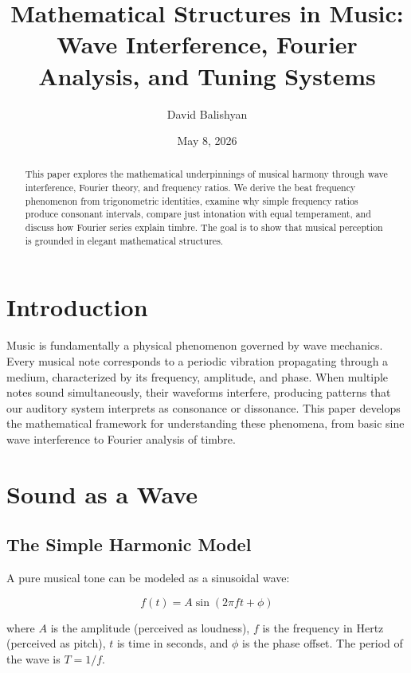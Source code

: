 \documentclass[11pt]{article}
\title{Mathematical Structures in Music: Wave Interference, Fourier Analysis, and Tuning Systems}
\author{David Balishyan}
\date{May 8, 2026}
\theoremstyle{definition}
\begin{document}
\maketitle

\begin{abstract}
This paper explores the mathematical underpinnings of musical harmony through wave interference, Fourier theory, and frequency ratios. We derive the beat frequency phenomenon from trigonometric identities, examine why simple frequency ratios produce consonant intervals, compare just intonation with equal temperament, and discuss how Fourier series explain timbre. The goal is to show that musical perception is grounded in elegant mathematical structures.
\end{abstract}

\section{Introduction}

Music is fundamentally a physical phenomenon governed by wave mechanics. Every musical note corresponds to a periodic vibration propagating through a medium, characterized by its frequency, amplitude, and phase. When multiple notes sound simultaneously, their waveforms interfere, producing patterns that our auditory system interprets as consonance or dissonance. This paper develops the mathematical framework for understanding these phenomena, from basic sine wave interference to Fourier analysis of timbre.

\section{Sound as a Wave}

\subsection{The Simple Harmonic Model}

A pure musical tone can be modeled as a sinusoidal wave:

\begin{equation}
    f(t) = A \sin(2\pi f t + \phi)
    \label{eq:sine}
\end{equation}

where $A$ is the amplitude (perceived as loudness), $f$ is the frequency in Hertz (perceived as pitch), $t$ is time in seconds, and $\phi$ is the phase offset. The period of the wave is $T = 1/f$.
\end{document}
